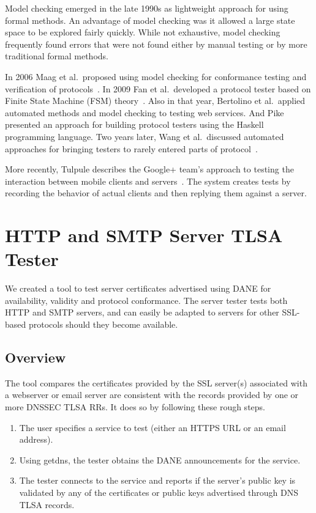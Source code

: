 \documentclass[preprint,3p,11pt]{elsarticle}
\begin{document}
Model checking emerged in the late 1990s as lightweight approach for
using formal methods. An advantage of model checking was it allowed a
large state space to be explored fairly quickly. While not exhaustive,
model checking frequently found errors that were not found either by
manual testing or by more traditional formal methods.

In 2006 Maag et al.\ proposed using model checking for conformance testing and
verification of protocols~\cite{Maag:2006:TMA:1163653.1163663}. In 2009 Fan et al.\ developed a protocol tester based on Finite State Machine
(FSM) theory~\cite{Fan:2009:PPT:1582379.1582477}. Also in that year,
Bertolino et al.\ applied automated methods and model checking to
testing web services\cite{Bertolino:2009:ASB:1595696.1595719}. And Pike presented an approach for building protocol testers using the
Haskell programming language\cite{Pike:2009:RYO:1596638.1596646}. Two
years later, Wang et al.\ discussed automated approaches for bringing testers to rarely
entered parts of protocol~\cite{Wang:2011:ADP:2069131.2069166}.

More recently, Tulpule describes the Google+ team's approach to testing the
interaction between mobile clients and
servers~\cite{Tulpule:2013:STC:2542128.2542134}. The system creates
tests by recording the behavior of actual clients and then replying them
against a server. 

\section{HTTP and SMTP Server TLSA Tester}
We created a tool to test server certificates advertised using DANE
for availability, validity and protocol conformance. The server tester
tests both HTTP and SMTP servers, and can easily be adapted to servers
for other SSL-based protocols should they become available.

\subsection{Overview}

The tool compares the certificates provided by the
SSL server(s) associated with a webserver or email server are
consistent with the records provided by one or more DNSSEC TLSA
RRs. It does so by following these rough steps. 

\begin{enumerate}
\item The user specifies a service to test (either an HTTPS URL or an
  email address).
\item Using getdns, the tester obtains the DANE announcements for the
  service. 
\item The tester connects to the service and reports if the server's
  public key is validated by any of the   certificates or public keys
  advertised through DNS TLSA records. 
\end{enumerate}
\end{document}
